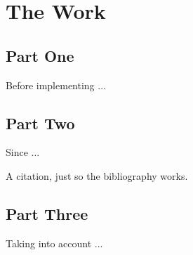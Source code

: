 \section{The Work}

\subsection{Part One}
Before implementing ...


\subsection{Part Two}
\label{ssec:part2}
Since ...

A citation\cite{emv_book3}, just so the bibliography works.


\subsection{Part Three}
\label{sec:part3}
Taking into account ...